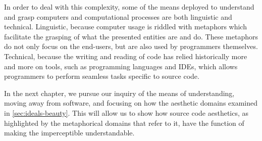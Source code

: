 In order to deal with this complexity, some of the means deployed to understand and grasp computers and computational processes are both linguistic and technical. Linguistic, because computer usage is riddled with metaphors which facilitate the grasping of what the presented entities are and do. These metaphors do not only focus on the end-users, but are also used by programmers themselves. Technical, because the writing and reading of code has relied historically more and more on tools, such as programming languages and IDEs, which allows programmers to perform seamless tasks specific to source code.

In the next chapter, we pursue our inquiry of the means of understanding, moving away from software, and focusing on how the aesthetic domains examined in \autoref{sec:ideals-beauty}. This will allow us to show how source code aesthetics, as highlighted by the metaphorical domains that refer to it, have the function of making the imperceptible understandable.
